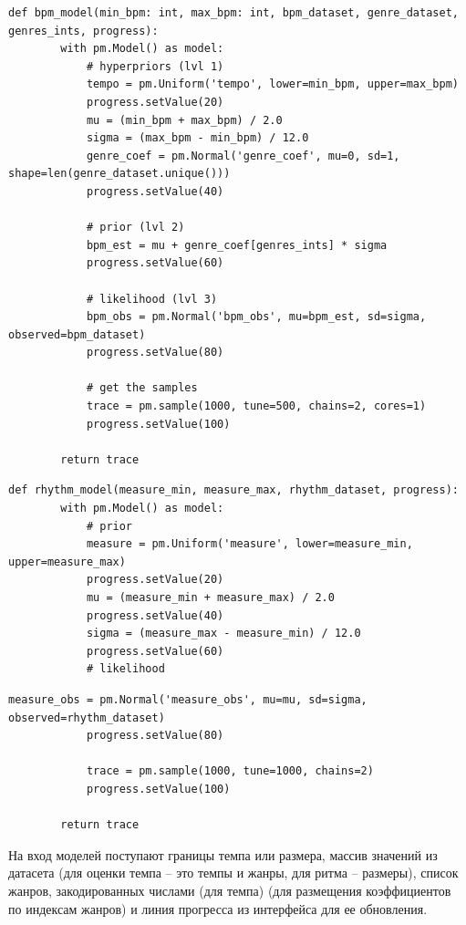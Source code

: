 \newpage

\begin{lstlisting}[label={lst:bpmmodel}, caption={реализация байесовской модели для определения темпа}]
	def bpm_model(min_bpm: int, max_bpm: int, bpm_dataset, genre_dataset, genres_ints, progress):
		with pm.Model() as model:
			# hyperpriors (lvl 1)
			tempo = pm.Uniform('tempo', lower=min_bpm, upper=max_bpm)
			progress.setValue(20)
			mu = (min_bpm + max_bpm) / 2.0
			sigma = (max_bpm - min_bpm) / 12.0
			genre_coef = pm.Normal('genre_coef', mu=0, sd=1, shape=len(genre_dataset.unique()))
			progress.setValue(40)
	
			# prior (lvl 2)
			bpm_est = mu + genre_coef[genres_ints] * sigma
			progress.setValue(60)
	
			# likelihood (lvl 3)
			bpm_obs = pm.Normal('bpm_obs', mu=bpm_est, sd=sigma, observed=bpm_dataset)
			progress.setValue(80)
	
			# get the samples
			trace = pm.sample(1000, tune=500, chains=2, cores=1)
			progress.setValue(100)
	
		return trace
\end{lstlisting}

\begin{lstlisting}[label={lst:measuremodel}, caption={реализация байесовской модели для определения ритма}]
	def rhythm_model(measure_min, measure_max, rhythm_dataset, progress):
		with pm.Model() as model:
			# prior
			measure = pm.Uniform('measure', lower=measure_min, upper=measure_max)
			progress.setValue(20)
			mu = (measure_min + measure_max) / 2.0
			progress.setValue(40)
			sigma = (measure_max - measure_min) / 12.0
			progress.setValue(60)
			# likelihood
\end{lstlisting}

\begin{lstlisting}[label={lst:measuremodel2}, caption={реализация байесовской модели для определения ритма (продолжение)}]
			measure_obs = pm.Normal('measure_obs', mu=mu, sd=sigma, observed=rhythm_dataset)
			progress.setValue(80)

			trace = pm.sample(1000, tune=1000, chains=2)
			progress.setValue(100)
	
		return trace
\end{lstlisting}

На вход моделей поступают границы темпа или размера, массив значений из датасета (для оценки темпа -- это темпы и жанры, для ритма -- размеры), список жанров, закодированных числами (для темпа) (для размещения коэффициентов по индексам жанров) и линия прогресса из интерфейса для ее обновления.

